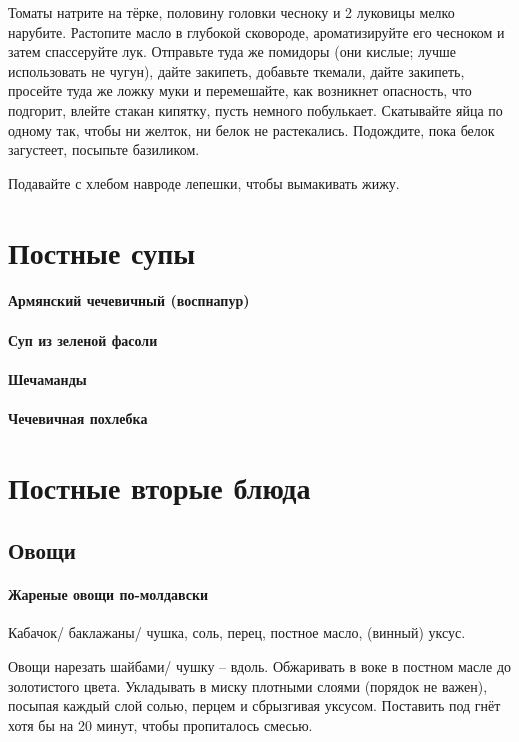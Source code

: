 \documentclass[11pt,a5paper]{article}
\begin{document}
Томаты натрите на тёрке, половину головки чесноку и 2 луковицы мелко нарубите. Растопите масло в глубокой сковороде, ароматизируйте его чесноком и затем спассеруйте лук. Отправьте туда же помидоры (они кислые; лучше использовать не чугун), дайте закипеть, добавьте ткемали, дайте закипеть, просейте туда же ложку муки и перемешайте, как возникнет опасность, что подгорит, влейте стакан кипятку, пусть немного побулькает. Скатывайте яйца по одному так, чтобы ни желток, ни белок не растекались. Подождите, пока белок загустеет, посыпьте базиликом.

Подавайте с хлебом навроде лепешки, чтобы вымакивать жижу.



\section{Постные супы}
\paragraph{Армянский чечевичный (воспнапур)}
\paragraph{Суп из зеленой фасоли}
\paragraph{Шечаманды}
\paragraph{Чечевичная похлебка}
\section{Постные вторые блюда}

\subsection{Овощи}

\paragraph{Жареные овощи по-молдавски} %
Кабачок/ баклажаны/ чушка, соль, перец, постное масло, (винный) уксус.

Овощи нарезать шайбами/ чушку -- вдоль. Обжаривать в воке в постном масле до золотистого цвета. Укладывать в миску плотными слоями (порядок не важен), посыпая каждый слой солью, перцем и сбрызгивая уксусом. Поставить под гнёт хотя бы на 20 минут, чтобы пропиталось смесью.
\end{document}
